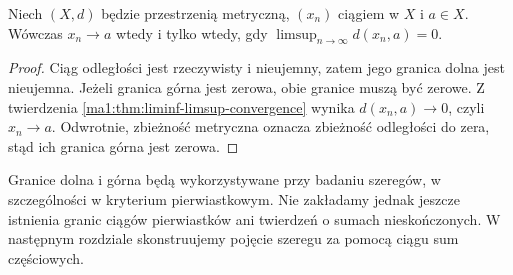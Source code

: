 \begin{wniosek}
\label{ma1:cor:limsup-modulus}
Niech $(X,d)$ będzie przestrzenią metryczną, $(x_n)$ ciągiem w $X$ i $a\in X$. Wówczas $x_n\to a$ wtedy i tylko wtedy, gdy $\limsup_{n\to\infty}d(x_n,a)=0$.
\end{wniosek}
\begin{proof}
Ciąg odległości jest rzeczywisty i nieujemny, zatem jego granica dolna jest nieujemna. Jeżeli granica górna jest zerowa, obie granice muszą być zerowe. Z twierdzenia \ref{ma1:thm:liminf-limsup-convergence} wynika $d(x_n,a)\to0$, czyli $x_n\to a$. Odwrotnie, zbieżność metryczna oznacza zbieżność odległości do zera, stąd ich granica górna jest zerowa.
\end{proof}
\begin{uwaga}
Granice dolna i górna będą wykorzystywane przy badaniu szeregów, w szczególności w kryterium pierwiastkowym. Nie zakładamy jednak jeszcze istnienia granic ciągów pierwiastków ani twierdzeń o sumach nieskończonych. W następnym rozdziale skonstruujemy pojęcie szeregu za pomocą ciągu sum częściowych.
\end{uwaga}
